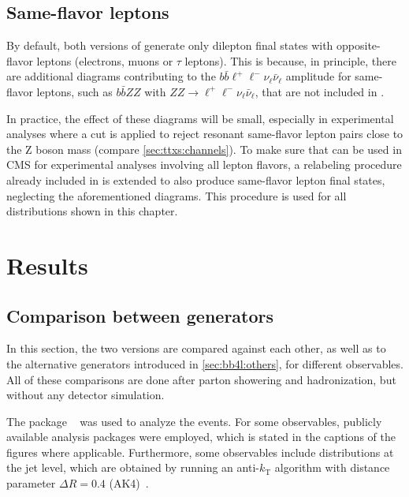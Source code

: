 \subsection{Same-flavor leptons}
\label{sec:bb4l:sameflavor}

By default, both versions of \bbfourl generate only dilepton final states with opposite-flavor leptons (electrons, muons or $\tau$ leptons). This is because, in principle, there are additional diagrams contributing to the $b \bar{b} \ell^+ \ell^- \nu_\ell \bar{\nu}_\ell$ amplitude for same-flavor leptons, such as $b \bar{b} ZZ$ with $ZZ \rightarrow \ell^+ \ell^- \nu_\ell \bar{\nu}_\ell$, that are not included in \bbfourl.

In practice, the effect of these diagrams will be small, especially in experimental analyses where a cut is applied to reject resonant same-flavor lepton pairs close to the Z boson mass (compare \cref{sec:ttxs:channels}). To make sure that \bbfourl can be used in CMS for experimental analyses involving all lepton flavors, a relabeling procedure already included in \bbfourl is extended to also produce same-flavor lepton final states, neglecting the aforementioned diagrams. This procedure is used for all \bbfourl distributions shown in this chapter.

\section{Results}

\subsection{Comparison between generators}

In this section, the two \bbfourl versions are compared against each other, as well as to the alternative generators introduced in \cref{sec:bb4l:others}, for different observables. All of these comparisons are done after parton showering and hadronization, but without any detector simulation.

The package \rivet~\cite{Rivet:2019rhm} was used to analyze the events. For some observables, publicly available analysis packages were employed, which is stated in the captions of the figures where applicable. Furthermore, some observables include distributions at the jet level, which are obtained by running an anti-$k_\mathrm{T}$ algorithm with distance parameter $\Delta R = 0.4$ (AK4)~\cite{Cacciari:2008gp}.

